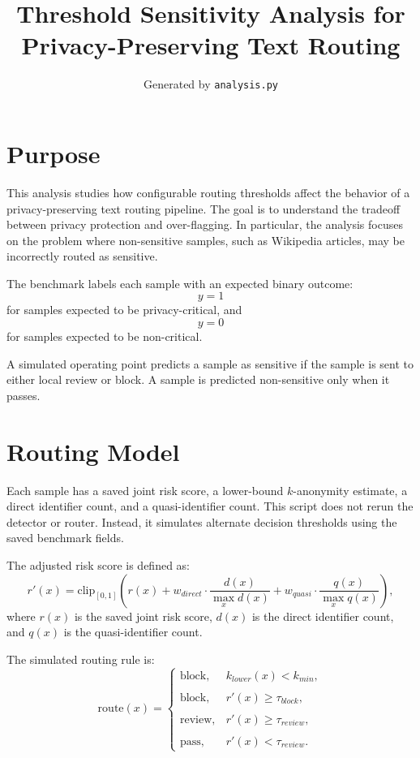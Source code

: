 \documentclass[11pt]{article}
\title{Threshold Sensitivity Analysis for Privacy-Preserving Text Routing}
\author{Generated by \texttt{analysis.py}}
\date{}
\begin{document}
\maketitle

\section{Purpose}

This analysis studies how configurable routing thresholds affect the behavior of a
privacy-preserving text routing pipeline. The goal is to understand the tradeoff
between privacy protection and over-flagging. In particular, the analysis focuses
on the problem where non-sensitive samples, such as Wikipedia articles, may be
incorrectly routed as sensitive.

The benchmark labels each sample with an expected binary outcome:
\[
    y = 1
\]
for samples expected to be privacy-critical, and
\[
    y = 0
\]
for samples expected to be non-critical.

A simulated operating point predicts a sample as sensitive if the sample is sent
to either local review or block. A sample is predicted non-sensitive only when it
passes.

\section{Routing Model}

Each sample has a saved joint risk score, a lower-bound $k$-anonymity estimate,
a direct identifier count, and a quasi-identifier count. This script does not
rerun the detector or router. Instead, it simulates alternate decision thresholds
using the saved benchmark fields.

The adjusted risk score is defined as:
\[
    r'(x)
    =
    \mathrm{clip}_{[0,1]}
    \left(
        r(x)
        + w_{direct} \cdot \frac{d(x)}{\max_x d(x)}
        + w_{quasi} \cdot \frac{q(x)}{\max_x q(x)}
    \right),
\]
where $r(x)$ is the saved joint risk score, $d(x)$ is the direct identifier
count, and $q(x)$ is the quasi-identifier count.

The simulated routing rule is:
\[
\mathrm{route}(x) =
\begin{cases}
\mathrm{block}, & k_{lower}(x) < k_{min}, \\\\
\mathrm{block}, & r'(x) \geq \tau_{block}, \\\\
\mathrm{review}, & r'(x) \geq \tau_{review}, \\\\
\mathrm{pass}, & r'(x) < \tau_{review}.
\end{cases}
\]
\end{document}
